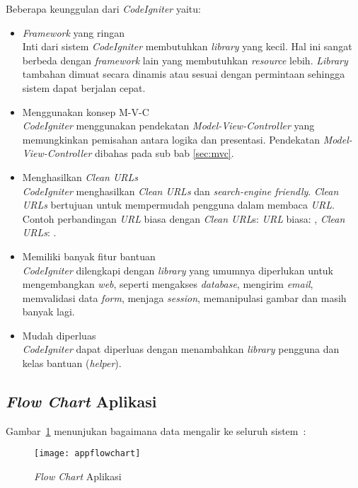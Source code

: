Beberapa keunggulan dari \textit{CodeIgniter} yaitu:
\begin{itemize}
	\item \textit{Framework} yang ringan \\
		Inti dari sistem \textit{CodeIgniter} membutuhkan \textit{library} yang kecil. Hal ini sangat berbeda dengan \textit{framework} lain yang membutuhkan \textit{resource} lebih. \textit{Library} tambahan dimuat secara dinamis atau sesuai dengan permintaan sehingga sistem dapat berjalan cepat.
	\item Menggunakan konsep M-V-C \\
		\textit{CodeIgniter} menggunakan pendekatan \textit{Model-View-Controller} yang memungkinkan pemisahan antara logika dan presentasi. Pendekatan \textit{Model-View-Controller} dibahas pada sub bab \ref{sec:mvc}.
	\item Menghasilkan \textit{Clean URLs} \\
		\textit{CodeIgniter} menghasilkan \textit{Clean URLs} dan \textit{search-engine friendly}. \textit{Clean URLs} bertujuan untuk mempermudah pengguna dalam membaca \textit{URL}. Contoh perbandingan \textit{URL} biasa dengan \textit{Clean URL}s: \textit{URL} biasa: , \textit{Clean URLs}: .
	\item Memiliki banyak fitur bantuan \\
		\textit{CodeIgniter} dilengkapi dengan \textit{library} yang umumnya diperlukan untuk mengembangkan \textit{web}, seperti mengakses \textit{database}, mengirim \textit{email}, memvalidasi data \textit{form}, menjaga \textit{session}, memanipulasi gambar dan masih banyak lagi.
	\item Mudah diperluas \\
		\textit{CodeIgniter} dapat diperluas dengan menambahkan \textit{library} pengguna dan kelas bantuan (\textit{helper}).
\end{itemize}

\subsection{\textit{Flow Chart} Aplikasi}
Gambar~\ref{fig:flow} menunjukan bagaimana data mengalir ke seluruh sistem~\cite{bcit:17:cidoc}:
\begin{figure}[H]
	\centering  
	\texttt{[image: appflowchart]}  
	\caption[\textit{Flow Chart} Aplikasi]{\textit{Flow Chart} Aplikasi} 
	\label{fig:flow} 
\end{figure} 

